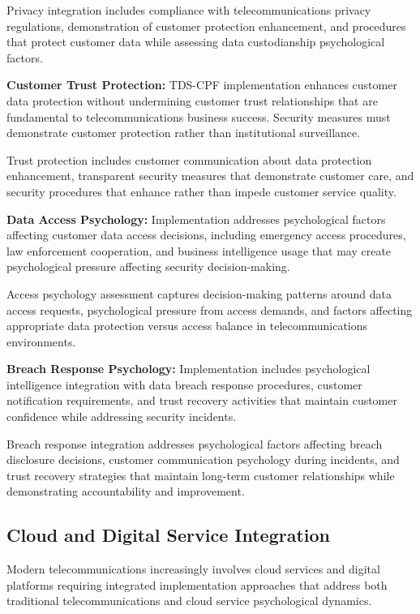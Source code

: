 \documentclass[10pt, twocolumn]{article}
\begin{document}
Privacy integration includes compliance with telecommunications privacy regulations, demonstration of customer protection enhancement, and procedures that protect customer data while assessing data custodianship psychological factors.

\textbf{Customer Trust Protection:} TDS-CPF implementation enhances customer data protection without undermining customer trust relationships that are fundamental to telecommunications business success. Security measures must demonstrate customer protection rather than institutional surveillance.

Trust protection includes customer communication about data protection enhancement, transparent security measures that demonstrate customer care, and security procedures that enhance rather than impede customer service quality.

\textbf{Data Access Psychology:} Implementation addresses psychological factors affecting customer data access decisions, including emergency access procedures, law enforcement cooperation, and business intelligence usage that may create psychological pressure affecting security decision-making.

Access psychology assessment captures decision-making patterns around data access requests, psychological pressure from access demands, and factors affecting appropriate data protection versus access balance in telecommunications environments.

\textbf{Breach Response Psychology:} Implementation includes psychological intelligence integration with data breach response procedures, customer notification requirements, and trust recovery activities that maintain customer confidence while addressing security incidents.

Breach response integration addresses psychological factors affecting breach disclosure decisions, customer communication psychology during incidents, and trust recovery strategies that maintain long-term customer relationships while demonstrating accountability and improvement.

\subsection{Cloud and Digital Service Integration}

Modern telecommunications increasingly involves cloud services and digital platforms requiring integrated implementation approaches that address both traditional telecommunications and cloud service psychological dynamics.
\end{document}
